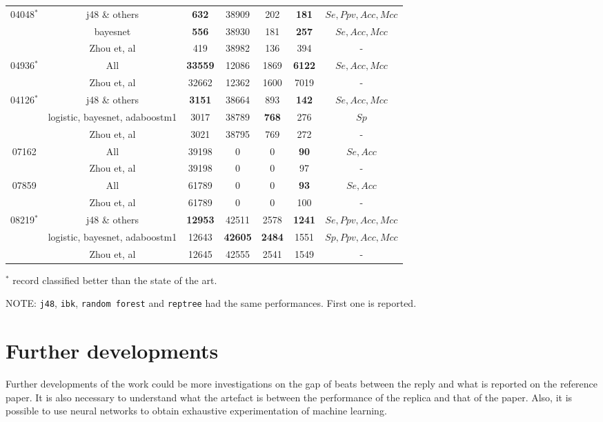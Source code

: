 \begin{table}[h]
\begin{center}
\begin{threeparttable}
\begin{tabular}{c c c c c c c}
  \hline
  04048$^*$ & j48 \& others & \textbf{632} & 38909 & 202 & \textbf{181} & $Se, Ppv, Acc, Mcc$ \\
  & bayesnet & \textbf{556} & 38930 & 181 & \textbf{257} & $Se, Acc, Mcc$ \\
  & Zhou et, al & 419 & 38982 & 136 & 394 & - \\
  \hline
  04936$^*$ & All & \textbf{33559} & 12086 & 1869 & \textbf{6122} & $Se, Acc, Mcc$ \\
  & Zhou et, al & 32662 & 12362 & 1600 & 7019 & - \\
  \hline
  04126$^*$ & j48 \& others & \textbf{3151} & 38664 & 893 & \textbf{142} & $Se, Acc, Mcc$ \\
  & logistic, bayesnet, adaboostm1 & 3017 & 38789 & \textbf{768} & 276 & $Sp$ \\
  & Zhou et, al & 3021 & 38795 & 769 & 272 & - \\
  \hline
  07162 & All & 39198 & 0 & 0 & \textbf{90} & $Se, Acc$ \\
  & Zhou et, al & 39198 & 0 & 0 & 97 & - \\
  \hline
  07859 & All & 61789 & 0 & 0 & \textbf{93} & $Se, Acc$ \\
  & Zhou et, al & 61789 & 0 & 0 & 100 & - \\
  \hline
  08219$^*$ & j48 \& others & \textbf{12953} & 42511 & 2578 & \textbf{1241} & $Se, Ppv, Acc, Mcc$ \\
  & logistic, bayesnet, adaboostm1 & 12643 & \textbf{42605} & \textbf{2484} & 1551 & $Sp, Ppv, Acc, Mcc$ \\
  & Zhou et, al & 12645 & 42555 & 2541 & 1549 & - \\
  \bottomrule
\end{tabular}
\begin{tablenotes}
	\item $^*$ record classified better than the state of the art.
	\item NOTE: \verb|j48|, \verb|ibk|, \verb|random forest| and \verb|reptree| had the same performances. First one is reported.
    \end{tablenotes}
\end{threeparttable}
\end{center}
\end{table}

\section{Further developments}
Further developments of the work could be more investigations on the gap of beats between the reply and what is reported on the reference paper. It is also necessary to understand what the artefact is between the performance of the replica and that of the paper.
Also, it is possible to use neural networks to obtain exhaustive experimentation of machine learning.
